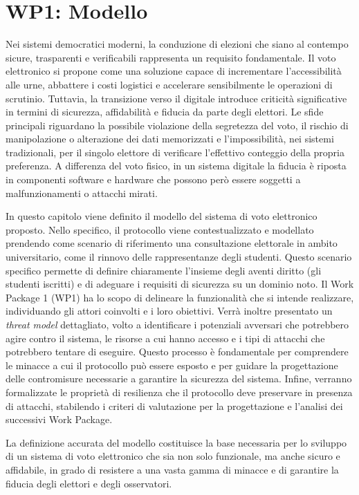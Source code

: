 \chapter{WP1: Modello}
\label{ch:wp1}

Nei sistemi democratici moderni, la conduzione di elezioni che siano al contempo sicure, trasparenti e verificabili rappresenta un requisito fondamentale. Il voto elettronico si propone come una soluzione capace di incrementare l'accessibilità alle urne, abbattere i costi logistici e accelerare sensibilmente le operazioni di scrutinio. Tuttavia, la transizione verso il digitale introduce criticità significative in termini di sicurezza, affidabilità e fiducia da parte degli elettori.
Le sfide principali riguardano la possibile violazione della segretezza del voto, il rischio di manipolazione o alterazione dei dati memorizzati e l'impossibilità, nei sistemi tradizionali, per il singolo elettore di verificare l'effettivo conteggio della propria preferenza. A differenza del voto fisico, in un sistema digitale la fiducia è riposta in componenti software e hardware che possono però essere soggetti a malfunzionamenti o attacchi mirati.

In questo capitolo viene definito il modello del sistema di voto elettronico proposto. Nello specifico, il protocollo viene contestualizzato e modellato prendendo come scenario di riferimento una consultazione elettorale in ambito universitario, come il rinnovo delle rappresentanze degli studenti. Questo scenario specifico permette di definire chiaramente l'insieme degli aventi diritto (gli studenti iscritti) e di adeguare i requisiti di sicurezza su un dominio noto. Il Work Package 1 (WP1) ha lo scopo di delineare la funzionalità che si intende realizzare, individuando gli attori coinvolti e i loro obiettivi. 
Verrà inoltre presentato un \textit{threat model} dettagliato, volto a identificare i potenziali avversari che potrebbero agire contro il sistema, le risorse a cui hanno accesso e i tipi di attacchi che potrebbero tentare di eseguire. Questo processo è fondamentale per comprendere le minacce a cui il protocollo può essere esposto e per guidare la progettazione delle contromisure necessarie a garantire la sicurezza del sistema. 
Infine, verranno formalizzate le proprietà di resilienza che il protocollo deve preservare in presenza di attacchi, stabilendo i criteri di valutazione per la progettazione e l'analisi dei successivi Work Package. 

La definizione accurata del modello costituisce la base necessaria per lo sviluppo di un sistema di voto elettronico che sia non solo funzionale, ma anche sicuro e affidabile, in grado di resistere a una vasta gamma di minacce e di garantire la fiducia degli elettori e degli osservatori.


